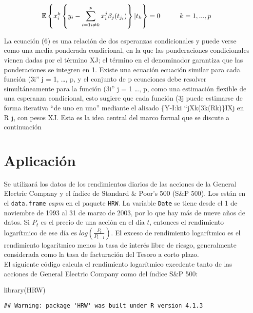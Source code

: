 \documentclass[
]{article}
\newenvironment{Shaded}{\begin{snugshade}}{\end{snugshade}}
\newcommand{\FunctionTok}[1]{\textcolor[rgb]{0.00,0.00,0.00}{#1}}
\newcommand{\NormalTok}[1]{#1}
\begin{document}
\[\mathbb{E}\left\{x^k_i\left\{y_i-\sum_{i=1\\i\neq k}^{p} x_i^j \beta_j(t_{j_i}) \right\}|t_k\right\}=0 \hspace{1cm}k=1,...,p\]

La ecuación (6) es una relación de dos esperanzas condicionales y puede
verse como una media ponderada condicional, en la que las ponderaciones
condicionales vienen dadas por el término XJ; el término en el
denominador garantiza que las ponderaciones se integren en 1. Existe una
ecuación ecuación similar para cada función (3i'' j = 1, \ldots, p, y el
conjunto de p ecuaciones debe resolver simultáneamente para la función
(3i'' j = 1 \ldots, p, como una estimación flexible de una esperanza
condicional, esto sugiere que cada función (3j puede estimarse de forma
iterativa ``de uno en uno'' mediante el alisado \{Y-I:ki
``jXk(3k(Rk)\}IXj en R j, con pesos XJ. Esta es la idea central del
marco formal que se discute a continuación

\hypertarget{aplicaciuxf3n}{%
\section{Aplicación}\label{aplicaciuxf3n}}

Se utilizará los datos de los rendimientos diarios de las acciones de la
General Electric Company y el índice de Standard \& Poor's 500 (S\&P
500). Los están en el \texttt{data.frame} \emph{capm} en el paquete
\texttt{HRW}. La variable \texttt{Date} se tiene desde el 1 de noviembre
de 1993 al 31 de marzo de 2003, por lo que hay más de nueve años de
datos. Si \(P_t\) es el precio de una acción en el día \(t\), entonces
el rendimiento logarítmico de ese día es \(log(\frac{P_t}{P_{t−1}} )\).
El exceso de rendimiento logarítmico es el rendimiento logarítmico menos
la tasa de interés libre de riesgo, generalmente considerada como la
tasa de facturación del Tesoro a corto plazo.\\
El siguiente código calcula el rendimiento logarítmico excedente tanto
de las acciones de General Electric Company como del índice S\&P 500:

\begin{Shaded}
\begin{Highlighting}[]
\FunctionTok{library}\NormalTok{(HRW) }
\end{Highlighting}
\end{Shaded}

\begin{verbatim}
## Warning: package 'HRW' was built under R version 4.1.3
\end{verbatim}
\end{document}
